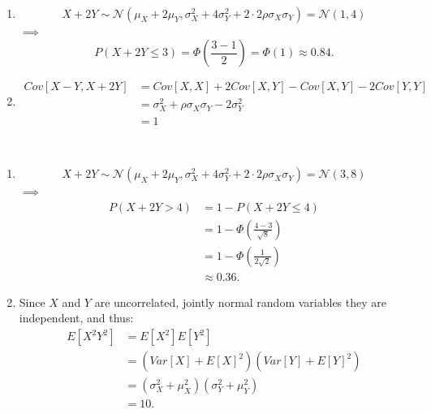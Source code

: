 \begin{problem}{36} $ $
\begin{enumerate}
\item 
\begin{equation*}
X+2Y  \sim \mathcal N(\mu_X+2\mu_Y, \sigma_X^2+4\sigma_Y^2+2 \cdot 2 \rho \sigma_X \sigma_Y) =\mathcal N (1, 4)
\end{equation*}
$\implies$
\begin{equation*}
P(X+2Y \le 3) = \Phi \left (\frac{3-1}{2} \right)= \Phi (1) \approx 0.84.
\end{equation*}

\item

\begin{align*}
Cov[X-Y, X+2Y] & = Cov[X, X]+2 Cov[X, Y]-Cov[X, Y]-2 Cov[Y, Y] \\
& = \sigma_X^2+ \rho \sigma_X \sigma_Y -2 \sigma_Y^2 \\
& = 1
\end{align*}

\end{enumerate}
\end{problem}

\begin{problem}{37} $ $
\begin{enumerate}
\item 
\begin{equation*}
X+2Y  \sim \mathcal N(\mu_X+2\mu_Y, \sigma_X^2+4\sigma_Y^2+2 \cdot 2 \rho \sigma_X \sigma_Y) =\mathcal N (3, 8)
\end{equation*}
$\implies$
\begin{align*}
P(X+2Y > 4) &= 1-P(X+2Y \le 4) \\
& = 1 - \Phi \left (\frac{4-3}{\sqrt{8}} \right) \\
& = 1 - \Phi \left (\frac{1}{2\sqrt{2}} \right) \\
& \approx 0.36.
\end{align*}

\item Since $X$ and $Y$ are uncorrelated, jointly normal random variables they are independent, and thus:
\begin{align*}
E[X^2Y^2] &= E[X^2] E[Y^2] \\
&=(Var[X]+E[X]^2)(Var[Y]+E[Y]^2) \\
&=(\sigma_X^2+\mu_X^2)(\sigma_Y^2+\mu_Y^2) \\
&=10.
\end{align*}

\end{enumerate}
\end{problem}



